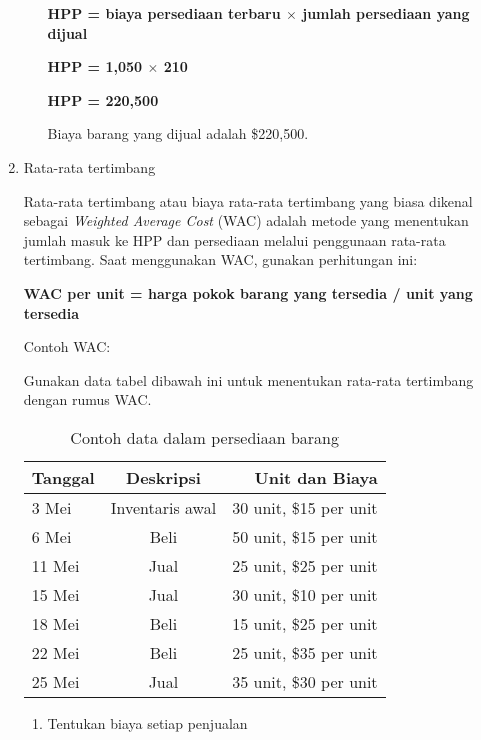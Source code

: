 \begin{enumerate}
\begin{enumerate}
		\textbf{HPP = biaya persediaan terbaru $\times$ jumlah persediaan yang dijual}

		\textbf{HPP = 1,050 $\times$ 210}

		\textbf{HPP = 220,500}

		Biaya barang yang dijual adalah \${220,500}.

	\end{enumerate}

	\item Rata-rata tertimbang
	
	Rata-rata tertimbang atau biaya rata-rata tertimbang yang biasa dikenal sebagai \textit{Weighted Average Cost} (WAC) adalah metode yang menentukan jumlah masuk ke HPP dan persediaan melalui penggunaan rata-rata tertimbang. Saat menggunakan WAC, gunakan perhitungan ini:

	\textbf{WAC per unit = harga pokok barang yang tersedia / unit yang tersedia}

	Contoh WAC:

	Gunakan data tabel dibawah ini untuk menentukan rata-rata tertimbang dengan rumus WAC.

	\begin{table}[h!]
		\begin{center}
		  \caption{Contoh data dalam persediaan barang}
		  \label{tab:table3}
		  \begin{tabular}{l|c|r} %
			\textbf{Tanggal} & \textbf{Deskripsi} & \textbf{Unit dan Biaya} \\
			\hline
			3 Mei & Inventaris awal & 30 unit, \${15} per unit\\
			6 Mei & Beli &  50 unit, \${15} per unit\\
			11 Mei & Jual &  25 unit, \${25} per unit\\
			15 Mei & Jual &  30 unit, \${10} per unit\\
			18 Mei & Beli &  15 unit, \${25} per unit\\
			22 Mei & Beli &  25 unit, \${35} per unit\\
			25 Mei & Jual &  35 unit, \${30} per unit\\
		  \end{tabular}
		\end{center}
	  \end{table}

	\begin{enumerate}
		\item Tentukan biaya setiap penjualan
		

\end{enumerate}
\end{enumerate}
